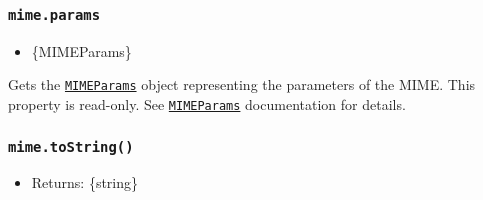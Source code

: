\begin{Shaded}
\begin{Highlighting}[]
\OperatorTok{=} \NormalTok{(}\NormalTok{)}\OperatorTok{;}

\OperatorTok{=}  \NormalTok{(}\NormalTok{)}\OperatorTok{;}
\NormalTok{)}\OperatorTok{;}
 \OperatorTok{=} \OperatorTok{;}
\NormalTok{)}\OperatorTok{;}
\NormalTok{(}\OperatorTok{;}
\end{Highlighting}
\end{Shaded}

\subsubsection{\texorpdfstring{\texttt{mime.params}}{mime.params}}\label{mime.params}

\begin{itemize}
\tightlist
\item
  \{MIMEParams\}
\end{itemize}

Gets the \hyperref[class-utilmimeparams]{\texttt{MIMEParams}} object
representing the parameters of the MIME. This property is read-only. See
\hyperref[class-utilmimeparams]{\texttt{MIMEParams}} documentation for
details.

\subsubsection{\texorpdfstring{\texttt{mime.toString()}}{mime.toString()}}\label{mime.tostring}

\begin{itemize}
\tightlist
\item
  Returns: \{string\}
\end{itemize}

